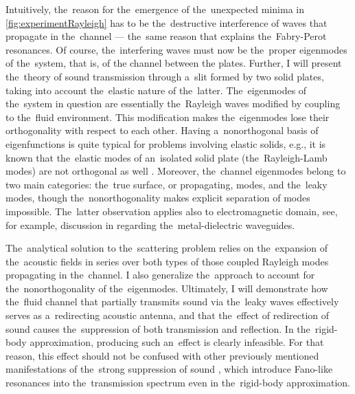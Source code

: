 Intuitively, the~reason for the~emergence of the~unexpected minima in \cref{fig:experimentRayleigh} has to be the~destructive interference of waves that propagate in the~channel --- the~same reason that explains the~Fabry-Perot resonances.
Of course, the~interfering waves must now be the~proper eigenmodes of the~system, that is, of the channel between the plates.
Further, I will present the~theory of sound transmission through a~slit formed by two solid plates, taking into account the~elastic nature of the~latter.
The~eigenmodes of the~system in question are essentially the~Rayleigh waves modified by coupling to the~fluid environment.
This modification makes the~eigenmodes lose their orthogonality with respect to each other.
Having a~nonorthogonal basis of eigenfunctions is quite typical for problems involving elastic solids, e.g., it is known that the~elastic modes of an~isolated solid plate (the~Rayleigh-Lamb modes) are not orthogonal as well \cite{achenbac}.
Moreover, the~channel eigenmodes belong to two main categories: the~true surface, or propagating, modes, and the~leaky modes, though the~nonorthogonality makes explicit separation of modes impossible.
The~latter observation applies also to electromagnetic domain, see, for example, discussion in \cite{sturman2} regarding the~metal-dielectric waveguides.

The~analytical solution to the~scattering problem relies on the~expansion of the~acoustic fields in series over both types of those coupled Rayleigh modes propagating in the~channel.
I also generalize the~approach to account for the~nonorthogonality of the~eigenmodes.
Ultimately, I will demonstrate how the~fluid channel that partially transmits sound via the~leaky waves effectively serves as a~redirecting acoustic antenna, and that the~effect of redirection of sound causes the~suppression of both transmission and reflection.
In the~rigid-body approximation, producing such an~effect is clearly infeasible.
For that reason, this effect should not be confused with other previously mentioned manifestations of the~strong suppression of sound \cite{norris4,estrada,estrada2,estrada3}, which introduce Fano-like resonances into the~transmission spectrum even in the~rigid-body approximation.



